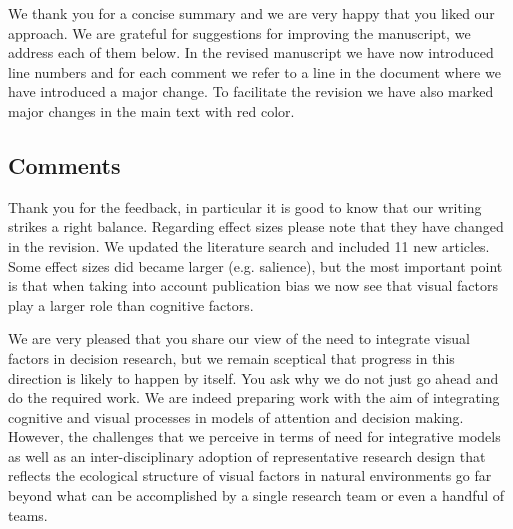 We thank you for a concise summary and we are very happy that you liked our approach.  We are grateful for suggestions for improving the manuscript, we address each of them below. In the revised manuscript we have now introduced line numbers and for each comment we refer to a line in the document where we have introduced a major change. To facilitate the revision we have also marked major changes in the main text with red color.


\subsection{Comments}


Thank you for the feedback, in particular it is good to know that our writing strikes a right balance. Regarding effect sizes please note that they have changed in the revision. We updated the literature search and included 11 new articles. Some effect sizes did became larger (e.g. salience), but the most important point is that when taking into account publication bias we now see that visual factors play a larger role than cognitive factors. 



We are very pleased that you share our view of the need to integrate visual factors in decision research, but we remain sceptical that progress in this direction is likely to happen by itself. You ask why we do not just go ahead and do the required work. We are indeed preparing work with the aim of integrating cognitive and visual processes in models of attention and decision making. However, the challenges that we perceive in terms of need for integrative models as well as an inter-disciplinary adoption of representative research design that reflects the ecological structure of visual factors in natural environments go far beyond what can be accomplished by a single research team or even a handful of teams. 

